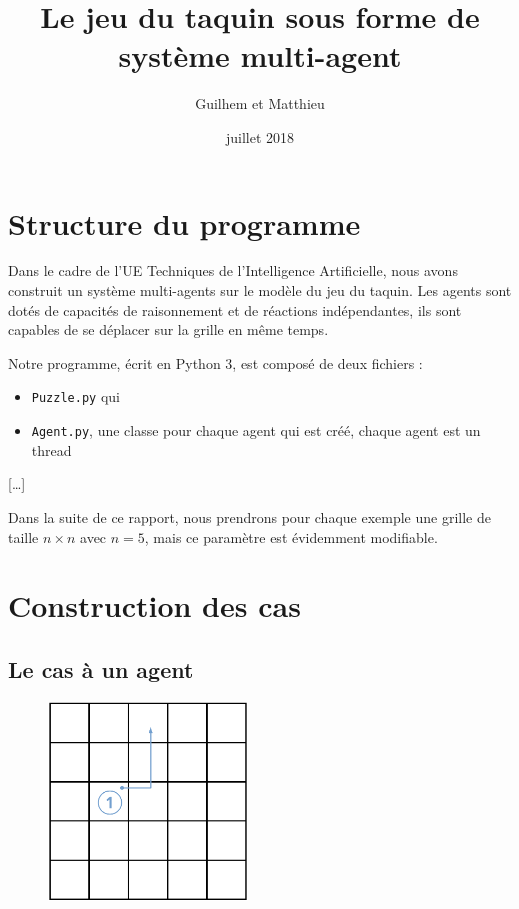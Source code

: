 \documentclass[a4paper, 12pt, french]{article}
\title{Le jeu du taquin sous forme de système multi-agent}
\author{Guilhem \bsc{Marion} et Matthieu \bsc{Vieira}}
\date{juillet 2018}
\begin{document}
\maketitle

\section{Structure du programme}

Dans le cadre de l'UE Techniques de l'Intelligence Artificielle, nous avons construit un système multi-agents sur le modèle du jeu du taquin. Les agents sont dotés de capacités de raisonnement et de réactions indépendantes, ils sont capables de se déplacer sur la grille en même temps.

Notre programme, écrit en Python 3, est composé de deux fichiers :
\begin{itemize}
	\item \texttt{Puzzle.py} qui 
	\item \texttt{Agent.py}, une classe pour chaque agent qui est créé, chaque agent est un thread
\end{itemize}

[…]

Dans la suite de ce rapport, nous prendrons pour chaque exemple une grille de taille $n \times n$ avec $n = 5$, mais ce paramètre est évidemment modifiable.

\section{Construction des cas}

\subsection{Le cas à un agent}

\begin{figure}[h]
	\centering
	\includegraphics[width=200px]{images/base_case.png}
\end{figure}
\end{document}
